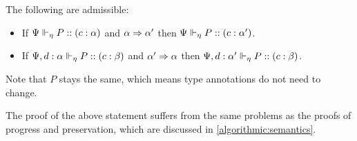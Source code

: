 \begin{conjecture}
  \label{algorithmic:delegation-sub}
  The following are admissible:
  \begin{itemize}
    \item If ${\Psi} \Vdash_{\eta} P :: (c : \alpha)$ and $\alpha \mathrel\Rightarrow \alpha'$ then ${\Psi} \Vdash_{\eta} P :: (c : \alpha')$.
    \item If ${\Psi, d : \alpha} \Vdash_{\eta} P :: (c : \beta)$ and $\alpha' \mathrel\Rightarrow \alpha$ then ${\Psi, d : \alpha'} \Vdash_{\eta} P :: (c : \beta)$.
  \end{itemize}
  Note that $P$ stays the same, which means type annotations do not need to change.
\end{conjecture}
The proof of the above statement suffers from the same problems as the proofs of progress and preservation, which are discussed in \cref{algorithmic:semantics}.

